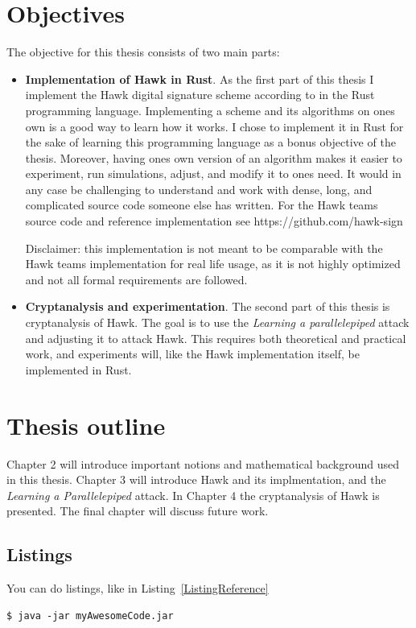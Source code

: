 \section{Objectives}
The objective for this thesis consists of two main parts:
\begin{itemize}
    \item \textbf{Implementation of Hawk in Rust}. As the first part of this thesis I implement the Hawk digital signature scheme according to \cite{HawkSpec24} in the Rust programming language. 
    Implementing a scheme and its algorithms on ones own is a good way to learn how it works. I chose to implement it in Rust for the sake of learning this programming language as a bonus objective of the thesis.
    Moreover, having ones own version of an algorithm makes it easier to experiment, run simulations, adjust, and modify it to ones need. It would in any case be challenging to understand and work with dense, long, 
    and complicated source code someone else has written. For the Hawk teams source code and reference implementation see https://github.com/hawk-sign

    Disclaimer: this implementation is not meant to be comparable with the Hawk teams implementation for real life usage, as it is not highly optimized and not all formal requirements are followed.

\item \textbf{Cryptanalysis and experimentation}. The second part of this thesis is cryptanalysis of Hawk. The goal is to use the \textit{Learning a parallelepiped} attack \cite{NR09} and adjusting it to attack Hawk. 
    This requires both theoretical and practical work, and experiments will, like the Hawk implementation itself, be implemented in Rust.
\end{itemize}
\section{Thesis outline}
Chapter 2 will introduce important notions and mathematical background used in this thesis. Chapter 3 will introduce Hawk and its implmentation, and the \textit{Learning a Parallelepiped} attack.
In Chapter 4 the cryptanalysis of Hawk is presented. The final chapter will discuss future work.


\subsection{Listings}
You can do listings, like in Listing~\ref{ListingReference}
\begin{lstlisting}[caption={[Short caption]Look at this cool listing. Find the rest in Appendix~\ref{Listing}},label=ListingReference]
$ java -jar myAwesomeCode.jar
\end{lstlisting}

